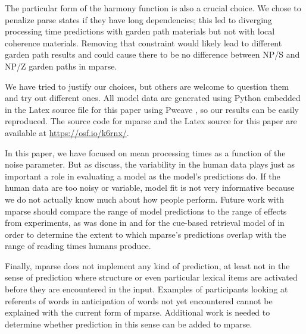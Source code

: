 \documentclass[a4paper, 12pt]{article}
\begin{document}
The particular form of the harmony function is also a crucial choice. We chose
to penalize parse states if they have long dependencies; this led to diverging
processing time predictions with garden path materials but not with local
coherence materials. Removing that constraint would likely lead to different
garden path results and could cause there to be no difference between NP/S and
NP/Z garden paths in mparse.

We have tried to justify our choices, but others are welcome to question them
and try out different ones. All model data are generated using Python embedded
in the Latex source file for this paper using Pweave \citep{pastell2017pweave},
so our results can be easily reproduced. The source code for mparse and the
Latex source for this paper are available at \url{https://osf.io/k6rnx/}.

In this paper, we have focused on mean processing times as a function of the
noise parameter. But as \citet{roberts2000how} discuss, the variability in the
human data plays just as important a role in evaluating a model as the model's
predictions do. If the human data are too noisy or variable, model fit is not
very informative because we do not actually know much about how people perform.
Future work with mparse should compare the range of model predictions to the
range of effects from experiments, as was done in
\citet{vasishth2018statistical} and \citet{jaeger2019interference} for the
cue-based retrieval model of \citet{lewis2005activation} in order to determine
the extent to which mparse's predictions overlap with the range of reading
times humans produce.

Finally, mparse does not implement any kind of prediction, at least not in the
sense of prediction where structure or even particular lexical items are
activated before they are encountered in the input. Examples of participants
looking at referents of words in anticipation of words not yet encountered
\citep[e.g.,][]{altmann1999incremental, kukona2014lexical} cannot be
explained with the current form of mparse. Additional work is needed to
determine whether prediction in this sense can be added to mparse.
\end{document}
